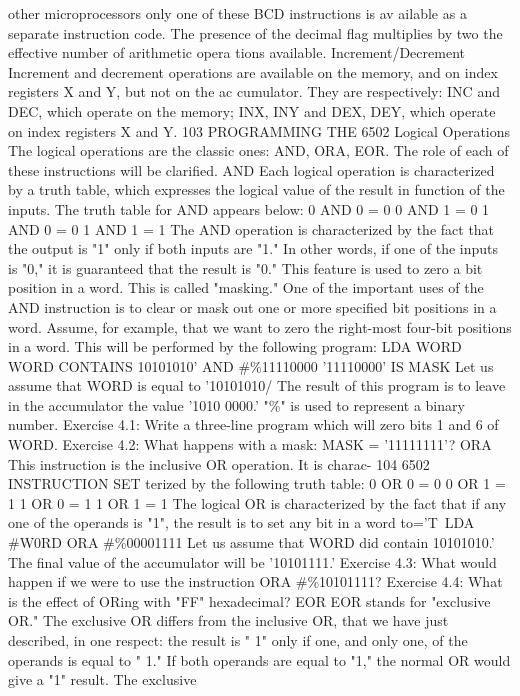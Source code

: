 \documentclass{book}
\begin{document}
other microprocessors only one of these BCD instructions is av
ailable as a separate instruction code. The presence of the decimal
flag multiplies by two the effective number of arithmetic opera
tions available.
Increment/Decrement
Increment and decrement operations are available on the
memory, and on index registers X and Y, but not on the ac
cumulator. They are respectively: INC and DEC, which operate on
the memory; INX, INY and DEX, DEY, which operate on index
registers X and Y.
103
PROGRAMMING THE 6502
Logical Operations
The logical operations are the classic ones: AND, ORA, EOR.
The role of each of these instructions will be clarified.
AND
Each logical operation is characterized by a truth table, which
expresses the logical value of the result in function of the inputs.
The truth table for AND appears below:
0 AND 0 = 0
0 AND 1 = 0
1 AND 0 = 0
1 AND 1 = 1
The AND operation is characterized by the fact that the output
is "1" only if both inputs are "1." In other words, if one of the
inputs is "0," it is guaranteed that the result is "0." This feature is
used to zero a bit position in a word. This is called "masking."
One of the important uses of the AND instruction is to clear or
mask out one or more specified bit positions in a word. Assume, for
example, that we want to zero the right-most four-bit positions in a
word. This will be performed by the following program:
LDA WORD WORD CONTAINS 10101010'
AND #\%11110000 '11110000' IS MASK
Let us assume that WORD is equal to '10101010/ The result of
this program is to leave in the accumulator the value '1010 0000.'
"\%" is used to represent a binary number.
Exercise 4.1: Write a three-line program which will zero bits 1 and
6 of WORD.
Exercise 4.2: What happens with a mask: MASK = '11111111'?
ORA
This instruction is the inclusive OR operation. It is charac-
104
6502 INSTRUCTION SET
terized by the following truth table:
0 OR 0 = 0
0 OR 1 = 1
1 OR 0 = 1
1 OR 1 = 1
The logical OR is characterized by the fact that if any one of the
operands is "1", the result is to set any bit in a word to='T\
LDA #W0RD
ORA #\%00001111
Let us assume that WORD did contain 10101010.' The final
value of the accumulator will be '10101111.'
Exercise 4.3: What would happen if we were to use the instruction
ORA #\%10101111?
Exercise 4.4: What is the effect of ORing with "FF" hexadecimal?
EOR
EOR stands for "exclusive OR." The exclusive OR differs from the
inclusive OR, that we have just described, in one respect: the result is " 1"
only if one, and only one, of the operands is equal to " 1." If both operands
are equal to "1," the normal OR would give a "1" result. The exclusive
\end{document}
